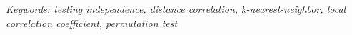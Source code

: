 \documentclass[11pt]{article}
\begin{document}
\noindent%
{\it Keywords: testing independence, distance correlation, k-nearest-neighbor, local correlation coefficient, permutation test}

\setcounter{tocdepth}{2}%
{\small\tableofcontents}












\newpage
{}




\end{document}
